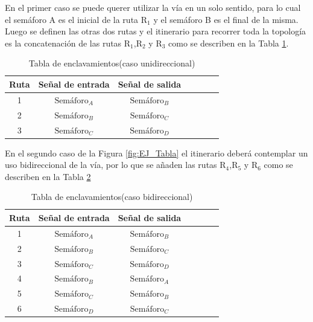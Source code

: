 	En el primer caso se puede querer utilizar la vía en un solo sentido, para lo cual el semáforo A es el inicial de la ruta $\text{R}_1$ y el semáforo B es el final de la misma. Luego se definen las otras dos rutas y el itinerario para recorrer toda la topología es la concatenación de las rutas $\text{R}_1$,$\text{R}_2$ y $\text{R}_3$ como se describen en la Tabla \ref{Tabla_simple}.
	
	\begin{table}[!hbt]
	\renewcommand{\arraystretch}{1.3}

	\caption{Tabla de enclavamientos(caso unidireccional)}
	\label{Tabla_simple}
	\centering

	\begin{tabular}{c c c c c c c}
	\hline
	Ruta & Señal de entrada & Señal de salida \\
	\hline
	 1 & $\text{Semáforo}_A$  & $\text{Semáforo}_B$ \\
	 2 & $\text{Semáforo}_B$  & $\text{Semáforo}_C$ \\
	 3 & $\text{Semáforo}_C$  & $\text{Semáforo}_D$ \\
	\hline
	\end{tabular}
	\end{table}
	
	En el segundo caso de la Figura \ref{fig:EJ_Tabla} el itinerario deberá contemplar un uso bidireccional de la vía, por lo que se añaden las rutas $\text{R}_4$,$\text{R}_5$ y $\text{R}_6$ como se describen en la Tabla \ref{Tabla_bidireccional}
	
	\begin{table}[!hbt]
	\renewcommand{\arraystretch}{1.3}

	\caption{Tabla de enclavamientos(caso bidireccional)}
	\label{Tabla_bidireccional}
	\centering

	\begin{tabular}{c c c c c c c}
	\hline
	Ruta & Señal de entrada & Señal de salida \\
	\hline
	 1 & $\text{Semáforo}_A$  & $\text{Semáforo}_B$ \\
	 2 & $\text{Semáforo}_B$  & $\text{Semáforo}_C$ \\
	 3 & $\text{Semáforo}_C$  & $\text{Semáforo}_D$ \\
	 4 & $\text{Semáforo}_B$  & $\text{Semáforo}_A$ \\
	 5 & $\text{Semáforo}_C$  & $\text{Semáforo}_B$ \\
	 6 & $\text{Semáforo}_D$  & $\text{Semáforo}_C$ \\
	\hline
	\end{tabular}
	\end{table}
	
